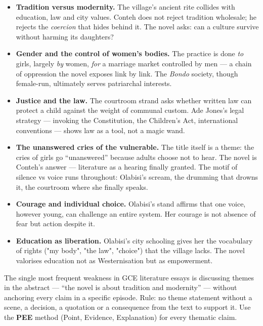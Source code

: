 \documentclass[11pt]{article}
\newcommand{\cle}[1]{{\popxbold\color{popdark}#1}}
\begin{document}
\begin{itemize}
\item \textbf{Tradition versus modernity.} The village's ancient rite collides with education, law and city values. Conteh does not reject tradition wholesale; he rejects the \emph{coercion} that hides behind it. The novel asks: can a culture survive without harming its daughters?
\item \textbf{Gender and the control of women's bodies.} The practice is done \emph{to} girls, largely \emph{by} women, \emph{for} a marriage market controlled by men --- a chain of oppression the novel exposes link by link. The \emph{Bondo} society, though female-run, ultimately serves patriarchal interests.
\item \textbf{Justice and the law.} The courtroom strand asks whether written law can protect a child against the weight of communal custom. Ade Jones's legal strategy --- invoking the Constitution, the Children's Act, international conventions --- shows law as a tool, not a magic wand.
\item \textbf{The unanswered cries of the vulnerable.} The title itself is a theme: the cries of girls go ``unanswered'' because adults choose not to hear. The novel is Conteh's answer --- literature as a hearing finally granted. The motif of \cle{silence vs voice} runs throughout: Olabisi's scream, the drumming that drowns it, the courtroom where she finally speaks.
\item \textbf{Courage and individual choice.} Olabisi's stand affirms that one voice, however young, can challenge an entire system. Her courage is not absence of fear but action despite it.
\item \textbf{Education as liberation.} Olabisi's city schooling gives her the vocabulary of rights ("my body", "the law", "choice") that the village lacks. The novel valorises education not as Westernisation but as empowerment.
\end{itemize}

\begin{attention}
The single most frequent weakness in GCE literature essays is discussing themes in the abstract --- ``the novel is about tradition and modernity'' --- without anchoring every claim in a \cle{specific episode}. Rule: no theme statement without a scene, a decision, a quotation or a consequence from the text to support it. Use the \textbf{PEE} method (Point, Evidence, Explanation) for every thematic claim.
\end{attention}
\end{document}
